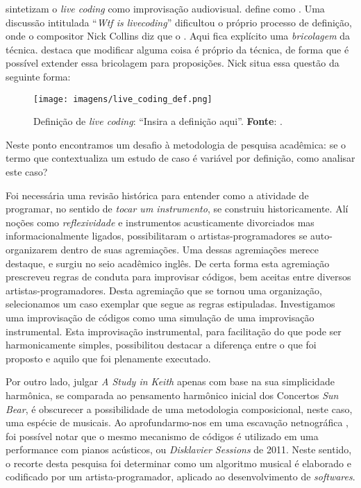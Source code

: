  sintetizam o \emph{live coding} como improvisação audiovisual.  define como . Uma discussão intitulada ``\emph{Wtf is livecoding}'' dificultou o próprio processo de definição, onde o compositor Nick Collins diz que o . Aqui fica explícito uma \emph{bricolagem} da técnica.  destaca que modificar alguma coisa é próprio da técnica, de forma que é possível extender essa bricolagem para proposições. Nick  situa essa questão da seguinte forma:

  \begin{figure}[h]
    \centering
    \texttt{[image: imagens/live\_coding\_def.png]}
    \caption{Definição de \emph{live coding}: ``Insira a definição aqui''. \textbf{Fonte}: .}
    \label{fig:live_coding_def}
  \end{figure}

Neste ponto encontramos um desafio à metodologia de pesquisa acadêmica: se o termo que contextualiza um estudo de caso é variável por definição, como analisar este caso? 

Foi necessária uma revisão histórica para entender como a atividade de programar, no sentido de \emph{tocar um instrumento}, se construiu historicamente. Alí noções como \emph{reflexividade} e instrumentos acusticamente divorciados mas informacionalmente ligados, possibilitaram o artistas-programadores se auto-organizarem dentro de suas agremiações. Uma dessas agremiações merece destaque, e surgiu no seio acadêmico inglês. De certa forma esta agremiação prescreveu regras de conduta para improvisar códigos, bem aceitas entre diversos artistas-programadores. Desta agremiação que se tornou uma organização, selecionamos um caso exemplar que segue as regras estipuladas. Investigamos uma improvisação de códigos como uma simulação de uma improvisação instrumental. Esta improvisação instrumental, para facilitação do que pode ser harmonicamente simples, possibilitou destacar a diferença entre o que foi proposto e aquilo que foi plenamente executado.

Por outro lado, julgar \emph{A Study in Keith} apenas com base na sua simplicidade harmônica, se comparada ao pensamento harmônico inicial dos Concertos \emph{Sun Bear}, é obscurecer a possibilidade de uma metodologia composicional, neste caso, uma espécie de  musicais. Ao aprofundarmo-nos em uma escavação netnográfica \cite{mori_analysing_2015}, foi possível notar que o mesmo mecanismo de códigos é utilizado em uma performance com pianos acústicos, ou \emph{Disklavier Sessions} de 2011. Neste sentido, o recorte desta pesquisa foi determinar como um algoritmo musical é elaborado e codificado por um artista-programador, aplicado ao desenvolvimento de \emph{softwares}.


